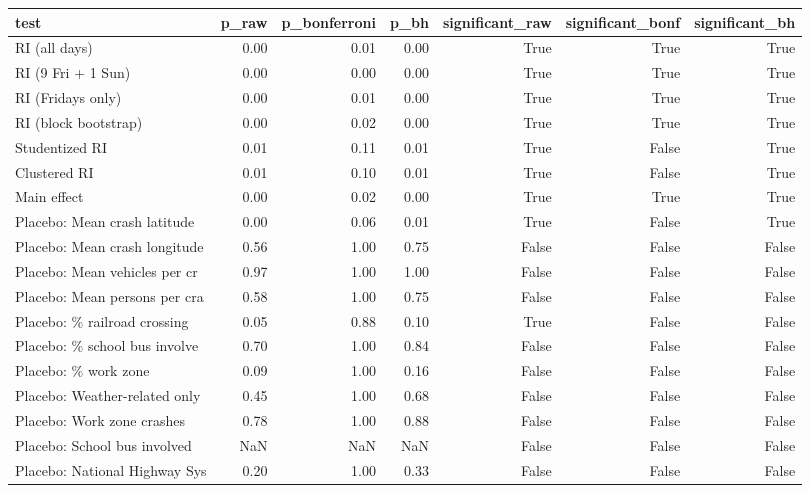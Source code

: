 \begin{tabular}{lrrrrrr}
\toprule
test & p\_raw & p\_bonferroni & p\_bh & significant\_raw & significant\_bonf & significant\_bh \\
\midrule
RI (all days) & 0.00 & 0.01 & 0.00 & True & True & True \\
RI (9 Fri + 1 Sun) & 0.00 & 0.00 & 0.00 & True & True & True \\
RI (Fridays only) & 0.00 & 0.01 & 0.00 & True & True & True \\
RI (block bootstrap) & 0.00 & 0.02 & 0.00 & True & True & True \\
Studentized RI & 0.01 & 0.11 & 0.01 & True & False & True \\
Clustered RI & 0.01 & 0.10 & 0.01 & True & False & True \\
Main effect & 0.00 & 0.02 & 0.00 & True & True & True \\
Placebo: Mean crash latitude & 0.00 & 0.06 & 0.01 & True & False & True \\
Placebo: Mean crash longitude & 0.56 & 1.00 & 0.75 & False & False & False \\
Placebo: Mean vehicles per cr & 0.97 & 1.00 & 1.00 & False & False & False \\
Placebo: Mean persons per cra & 0.58 & 1.00 & 0.75 & False & False & False \\
Placebo: \% railroad crossing & 0.05 & 0.88 & 0.10 & True & False & False \\
Placebo: \% school bus involve & 0.70 & 1.00 & 0.84 & False & False & False \\
Placebo: \% work zone & 0.09 & 1.00 & 0.16 & False & False & False \\
Placebo: Weather-related only & 0.45 & 1.00 & 0.68 & False & False & False \\
Placebo: Work zone crashes & 0.78 & 1.00 & 0.88 & False & False & False \\
Placebo: School bus involved & NaN & NaN & NaN & False & False & False \\
Placebo: National Highway Sys & 0.20 & 1.00 & 0.33 & False & False & False \\
\bottomrule
\end{tabular}
